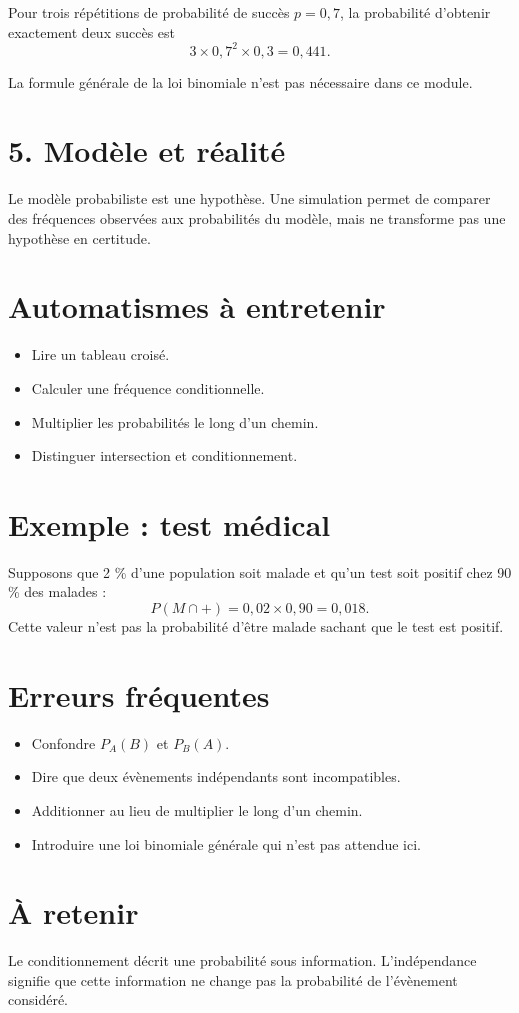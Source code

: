 Pour trois répétitions de probabilité de succès $p=0{,}7$, la probabilité d'obtenir exactement deux succès est
\[
3\times0{,}7^2\times0{,}3=0{,}441.
\]

La formule générale de la loi binomiale n'est pas nécessaire dans ce module.

\section{5. Modèle et réalité}
Le modèle probabiliste est une hypothèse. Une simulation permet de comparer des fréquences observées aux probabilités du modèle, mais ne transforme pas une hypothèse en certitude.

\section{Automatismes à entretenir}
\begin{itemize}
\item Lire un tableau croisé.
\item Calculer une fréquence conditionnelle.
\item Multiplier les probabilités le long d'un chemin.
\item Distinguer intersection et conditionnement.
\end{itemize}

\section{Exemple : test médical}
Supposons que 2 \% d'une population soit malade et qu'un test soit positif chez 90 \% des malades :
\[
P(M\cap +)=0{,}02\times0{,}90=0{,}018.
\]
Cette valeur n'est pas la probabilité d'être malade sachant que le test est positif.

\section{Erreurs fréquentes}
\begin{itemize}
\item Confondre $P_A(B)$ et $P_B(A)$.
\item Dire que deux évènements indépendants sont incompatibles.
\item Additionner au lieu de multiplier le long d'un chemin.
\item Introduire une loi binomiale générale qui n'est pas attendue ici.
\end{itemize}

\section{À retenir}
Le conditionnement décrit une probabilité sous information. L'indépendance signifie que cette information ne change pas la probabilité de l'évènement considéré.

